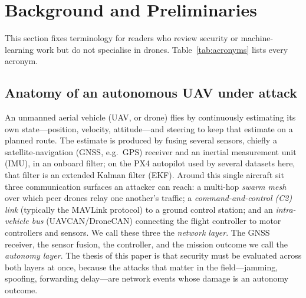 \documentclass[conference]{IEEEtran}
\begin{document}
\section{Background and Preliminaries}
\label{sec:prelim}
This section fixes terminology for readers who review security or
machine-learning work but do not specialise in drones.
Table~\ref{tab:acronyms} lists every acronym.

\subsection{Anatomy of an autonomous UAV under attack}
An unmanned aerial vehicle (UAV, or drone) flies by continuously estimating its
own state---position, velocity, attitude---and steering to keep that estimate on
a planned route. The estimate is produced by fusing several sensors, chiefly a
satellite-navigation (GNSS, e.g.\ GPS) receiver and an inertial measurement unit
(IMU), in an onboard filter; on the PX4 autopilot used by several datasets here,
that filter is an extended Kalman filter (EKF). Around this single aircraft sit
three communication surfaces an attacker can reach: a multi-hop \emph{swarm
mesh} over which peer drones relay one another's traffic; a
\emph{command-and-control (C2) link} (typically the MAVLink protocol) to a
ground control station; and an \emph{intra-vehicle bus} (UAVCAN/DroneCAN)
connecting the flight controller to motor controllers and sensors. We call these
three the \emph{network layer}. The GNSS receiver, the sensor fusion, the
controller, and the mission outcome we call the \emph{autonomy layer}. The thesis
of this paper is that security must be evaluated across both layers at once,
because the attacks that matter in the field---jamming, spoofing, forwarding
delay---are network events whose damage is an autonomy outcome.
\end{document}
